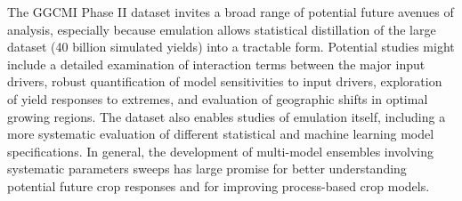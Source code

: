\documentclass[gmd, manuscript]{copernicus} %
\begin{document}
The GGCMI Phase II dataset invites a broad range of potential future avenues of analysis, especially because emulation allows statistical distillation of the large dataset (40 billion simulated yields) into a tractable form. 
Potential studies might include a detailed examination of interaction terms between the major input drivers, robust quantification of model sensitivities to input drivers, exploration of yield responses to extremes, and evaluation of geographic shifts in optimal growing regions. 
The dataset also enables studies of emulation itself, including a more systematic evaluation of different statistical and machine learning model specifications.
In general, the development of multi-model ensembles involving systematic parameters sweeps has large promise for better understanding potential future crop responses and for improving process-based crop models.




\end{document}

